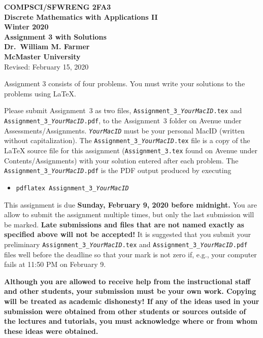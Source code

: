 \documentclass[11pt,fleqn]{article}
\begin{document}
\begin{center}

  {\large \textbf{COMPSCI/SFWRENG 2FA3}}\\[2mm]
  {\large \textbf{Discrete Mathematics with Applications II}}\\[2mm]
  {\large \textbf{Winter 2020}}\\[8mm]
  {\huge \textbf{Assignment 3 with Solutions}}\\[6mm]
  {\large \textbf{Dr.~William M. Farmer}}\\[2mm]
  {\large \textbf{McMaster University}}\\[6mm]
  {\large Revised: February 15, 2020}

\end{center}

\medskip

Assignment 3 consists of four problems.  You must write your solutions
to the problems using LaTeX.

Please submit Assignment~3 as two files,
\texttt{Assignment\_3\_\emph{YourMacID}.tex} and
\texttt{Assignment\_3\_\emph{YourMacID}.pdf}, to the Assignment~3
folder on Avenue under Assessments/Assignments.
\texttt{\emph{YourMacID}} must be your personal MacID (written without
capitalization).  The \texttt{Assignment\_3\_\emph{YourMacID}.tex}
file is a copy of the LaTeX source file for this assignment
(\texttt{Assignment\_3.tex} found on Avenue under
Contents/Assignments) with your solution entered after each problem.
The \texttt{Assignment\_3\_\emph{YourMacID}.pdf} is the PDF output
produced by executing

\begin{itemize}

  \item[] \texttt{pdflatex Assignment\_3\_\emph{YourMacID}}

\end{itemize}

This assignment is due \textbf{Sunday, February 9, 2020 before
  midnight.}  You are allow to submit the assignment multiple times,
but only the last submission will be marked.  \textbf{Late submissions
  and files that are not named exactly as specified above will not be
  accepted!}  It is suggested that you submit your preliminary
\texttt{Assignment\_3\_\emph{YourMacID}.tex} and
\texttt{Assignment\_3\_\emph{YourMacID}.pdf} files well before the
deadline so that your mark is not zero if, e.g., your computer fails
at 11:50 PM on February 9.

\textbf{Although you are allowed to receive help from the
  instructional staff and other students, your submission must be your
  own work.  Copying will be treated as academic dishonesty! If any of
  the ideas used in your submission were obtained from other students
  or sources outside of the lectures and tutorials, you must
  acknowledge where or from whom these ideas were obtained.}
\end{document}
